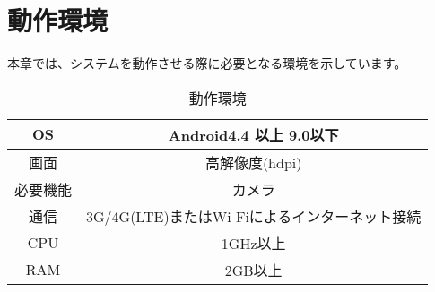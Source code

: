 \documentclass[a4j]{jarticle}
\begin{document}
\section{動作環境}
本章では、システムを動作させる際に必要となる環境を示しています。

\begin{table}[H]
    \caption{動作環境}
    \label{Operationg_Environment}
    \begin{center}
        \begin{tabular}{|c||c|} \hline
            OS & Android4.4 以上 9.0以下 \\ \hline
            画面 & 高解像度(hdpi) \\ \hline
            必要機能 & カメラ \\ \hline
            通信 & 3G/4G(LTE)またはWi-Fiによるインターネット接続 \\ \hline
            CPU & 1GHz以上 \\ \hline
            RAM & 2GB以上 \\ \hline

        \end{tabular}
    \end{center}
\end{table}
\end{document}
